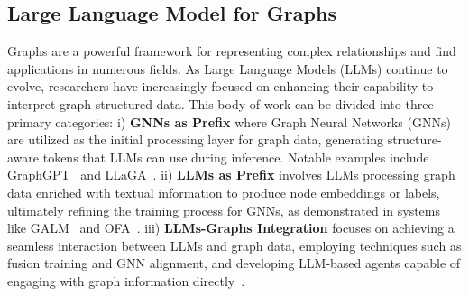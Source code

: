 \subsection{Large Language Model for Graphs}\vspace{-0.05in}
Graphs are a powerful framework for representing complex relationships and find applications in numerous fields. As Large Language Models (LLMs) continue to evolve, researchers have increasingly focused on enhancing their capability to interpret graph-structured data. This body of work can be divided into three primary categories: i) \textbf{GNNs as Prefix} where Graph Neural Networks (GNNs) are utilized as the initial processing layer for graph data, generating structure-aware tokens that LLMs can use during inference. Notable examples include GraphGPT~\cite{tang2024graphgpt} and LLaGA~\cite{chenllaga}. ii) \textbf{LLMs as Prefix} involves LLMs processing graph data enriched with textual information to produce node embeddings or labels, ultimately refining the training process for GNNs, as demonstrated in systems like GALM~\cite{xie2023graph} and OFA~\cite{liuone}. iii) \textbf{LLMs-Graphs Integration} focuses on achieving a seamless interaction between LLMs and graph data, employing techniques such as fusion training and GNN alignment, and developing LLM-based agents capable of engaging with graph information directly~\cite{li2023grenade,brannon2023congrat}.